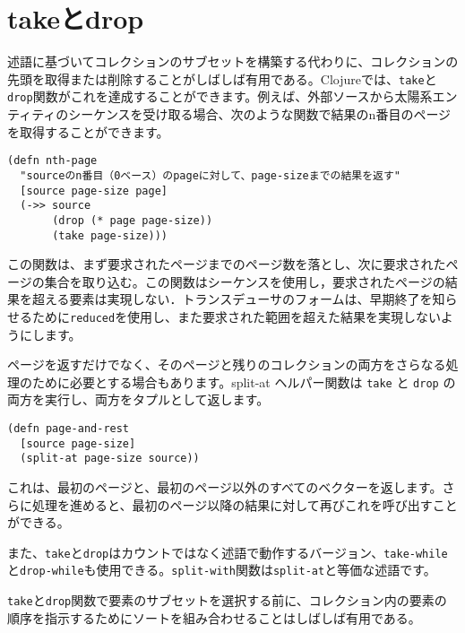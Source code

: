 \section{takeとdrop}

述語に基づいてコレクションのサブセットを構築する代わりに、コレクションの先頭を取得または削除することがしばしば有用である。Clojureでは、\texttt{take}と\texttt{drop}関数がこれを達成することができます。例えば、外部ソースから太陽系エンティティのシーケンスを受け取る場合、次のような関数で結果のn番目のページを取得することができます。


\begin{lstlisting}[numbers=none]
(defn nth-page
  "sourceのn番目（0ベース）のpageに対して、page-sizeまでの結果を返す"
  [source page-size page]
  (->> source
       (drop (* page page-size))
       (take page-size)))
\end{lstlisting}

この関数は、まず要求されたページまでのページ数を落とし、次に要求されたページの集合を取り込む。この関数はシーケンスを使用し，要求されたページの結果を超える要素は実現しない．トランスデューサのフォームは、早期終了を知らせるために\texttt{reduced}を使用し、また要求された範囲を超えた結果を実現しないようにします。

ページを返すだけでなく、そのページと残りのコレクションの両方をさらなる処理のために必要とする場合もあります。split-at ヘルパー関数は \texttt{take} と \texttt{drop} の両方を実行し、両方をタプルとして返します。


\begin{lstlisting}[numbers=none]
(defn page-and-rest
  [source page-size]
  (split-at page-size source))
\end{lstlisting}

これは、最初のページと、最初のページ以外のすべてのベクターを返します。さらに処理を進めると、最初のページ以降の結果に対して再びこれを呼び出すことができる。

また、\texttt{take}と\texttt{drop}はカウントではなく述語で動作するバージョン、\texttt{take-while}と\texttt{drop-while}も使用できる。\texttt{split-with}関数は\texttt{split-at}と等価な述語です。

\texttt{take}と\texttt{drop}関数で要素のサブセットを選択する前に、コレクション内の要素の順序を指示するためにソートを組み合わせることはしばしば有用である。




